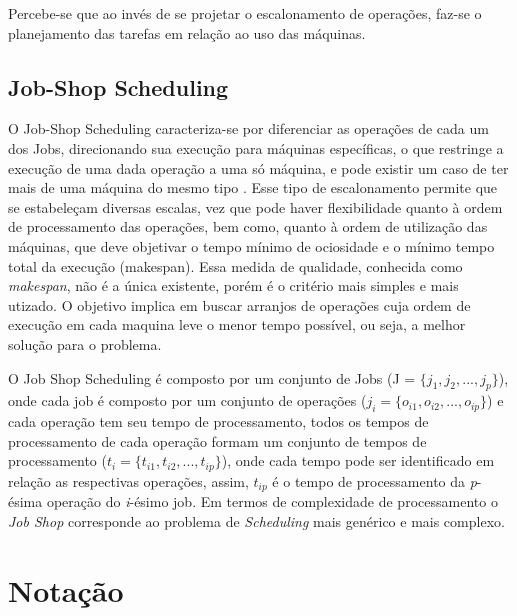 			Percebe-se que ao invés de se projetar o escalonamento de operações, faz-se o planejamento das tarefas em relação ao uso das máquinas.

\subsection{Job-Shop Scheduling}
O Job-Shop Scheduling caracteriza-se por diferenciar as operações de cada um dos Jobs, direcionando sua execução para máquinas específicas, o que restringe a execução de uma dada operação a uma só máquina, e pode existir um caso de ter mais de uma máquina do mesmo tipo \cite{PINEDO}. Esse tipo de escalonamento permite que se estabeleçam diversas escalas, vez que pode haver flexibilidade quanto à ordem de processamento das operações, bem como, quanto à ordem de utilização das máquinas, que deve objetivar o tempo mínimo de ociosidade e o mínimo tempo total da execução (makespan). Essa medida de qualidade, conhecida como \textit{makespan}, não é a única existente, porém é o critério mais simples e mais utizado.  O objetivo implica em buscar arranjos de operações cuja ordem de execução em cada maquina leve o menor tempo possível, ou seja, a melhor solução para o problema.

O Job Shop Scheduling é composto por um conjunto de Jobs (J = $\{j_1, j_2, ...,j_p\}$), onde cada job é composto por um conjunto de operações ($ j_i=\{ o_{i1}, o_{i2}, ..., o_{ip} \} $) e cada operação tem seu tempo de processamento, todos os tempos de processamento de cada operação formam um conjunto de tempos de processamento ($t_i=\{t_{i1}, t_{i2}, ...,t_{ip}\} $), onde cada tempo pode ser identificado em relação as respectivas operações, assim, $t_{ip}$ é o tempo de processamento da \textit{p}-ésima operação do \textit{i}-ésimo job. Em termos de complexidade de processamento o \textit{Job Shop} corresponde ao problema de \textit{Scheduling} mais genérico e mais complexo.

\section{Notação}

